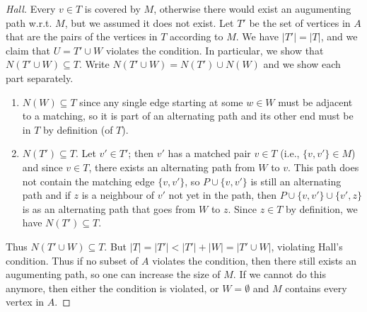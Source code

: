 \documentclass[12pt, a4paper]{book}
\theoremstyle{nonumberplain}
\newtheorem{proof}{Proof}
\begin{document}
\begin{proof}[Hall]
    Every $v\in T$ is covered by $M$, otherwise there would exist an augumenting path w.r.t. $M$, but we assumed it does not exist.
    Let $T'$ be the set of vertices in $A$ that are the pairs of the vertices in $T$ according to $M$.
    We have $|T'|=|T|$, and we claim that $U=T'\cup W$ violates the condition.
    In particular, we show that $N(T'\cup W)\subseteq T$.
    Write $N(T'\cup W)=N(T')\cup N(W)$ and we show each part separately.
    \begin{enumerate}[nolistsep]
        \item $N(W)\subseteq T$ since any single edge starting at some $w\in W$ must be adjacent to a matching, so it is part of an alternating path and its other end must be in $T$ by definition (of $T$).
        \item $N(T')\subseteq T$.
            Let $v'\in T'$; then $v'$ has a matched pair $v\in T$ (i.e., $\{v,v'\}\in M$) and since $v\in T$, there exists an alternating path from $W$ to $v$.
            This path does not contain the matching edge $\{v,v'\}$, so $P\cup\{v,v'\}$ is still an alternating path and if $z$ is a neighbour of $v'$ not yet in the path, then $P\cup\{v,v'\}\cup \{v',z\}$ is as an alternating path that goes from $W$ to $z$.
            Since $z\in T$ by definition, we have $N(T')\subseteq T$.
    \end{enumerate}
    Thus $N(T'\cup W)\subseteq T$.
    But $|T|=|T'|<|T'|+|W|=|T'\cup W|$, violating Hall's condition.
    Thus if no subset of $A$ violates the condition, then there still exists an augumenting path, so one can increase the size of $M$.
    If we cannot do this anymore, then either the condition is violated, or $W=\emptyset$ and $M$ contains every vertex in $A$.
\end{proof}
\end{document}
